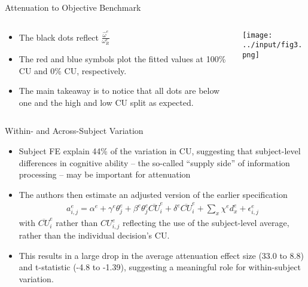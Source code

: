 \documentclass[11pt, aspectratio=169]{beamer}
\begin{document}

\begin{frame}{Attenuation to Objective Benchmark}
    
    \begin{columns}
    
        \begin{column}{0.3\textwidth}
            \begin{itemize}
                \item The black dots reflect $\frac{\hat{\omega}^e}{\omega_R^e}$ 
                \item The red and blue symbols plot the fitted values 
                    at 100\% CU and 0\% CU, respectively.
                \item The main takeaway is to notice that all 
                    dots are below one and the high and low CU 
                    split as expected. 
            \end{itemize}
        \end{column}
    
        \begin{column}{0.7\textwidth}
            \texttt{[image: ../input/fig3.png]}
        \end{column}
    
    \end{columns}
    
\end{frame}


\begin{frame}{Within- and Across-Subject Variation}

    \begin{itemize}
        \item Subject FE 
            explain 44\% of the variation in CU,
            suggesting that subject-level
            differences in cognitive ability 
            -- the so-called ``supply side''
            of information processing -- 
            may be important for attenuation
        \item The authors then estimate an adjusted version 
            of the earlier specification 
                \begin{align}
                    a_{i, j}^e=\alpha^e+\gamma^e \theta_j^e+\beta^e \theta_j^e \overline{CU}_{i}^e+\delta^e \overline{CU}_{i}^e+\sum_x \chi^e d_x^e+\epsilon_{i, j}^e
                \end{align}
            with $\overline{CU}_{i}^e$ rather than $ C U_{i, j}^e$
            reflecting the use of the subject-level average,
            rather than the individual decision's CU.
        \item This results in a large drop in the 
            average attenuation effect size (33.0 to 8.8) and
            t-statistic (-4.8 to -1.39),
            suggesting a meaningful role for within-subject variation.
    \end{itemize}
    
\end{frame}
\end{document}
